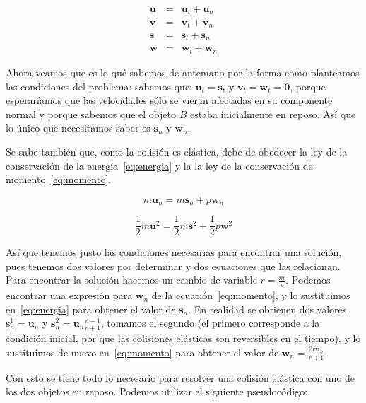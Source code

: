 \begin{eqnarray}
 \textbf{u} & = & \textbf{u}_t + \textbf{u}_n \nonumber \\
 \textbf{v} & = & \textbf{v}_t + \textbf{v}_n \nonumber \\
 \textbf{s} & = & \textbf{s}_t + \textbf{s}_n \nonumber \\
 \textbf{w} & = & \textbf{w}_t + \textbf{w}_n \nonumber
\end{eqnarray}

Ahora veamos que es lo qué sabemos de antemano por la forma como planteamos las condiciones del problema: sabemos que: $\textbf{u}_t = \textbf{s}_t$ y $\textbf{v}_t = \textbf{w}_t = \textbf{0}$, porque esperaríamos que las velocidades sólo se vieran afectadas en su componente normal y porque sabemos que el objeto $B$ estaba inicialmente en reposo.
Así que lo único que necesitamos saber es $\textbf{s}_n$ y $\textbf{w}_n$.

Se sabe también que, como la colisión es elástica, debe de obedecer la ley de la conservación de la energía~\eqref{eq:energia} y la la ley de la conservación de momento~\eqref{eq:momento}.

\begin{equation}
m \textbf{u}_n = m \textbf{s}_n + p \textbf{w}_n
\label{eq:momento}
\end{equation}

\begin{equation}
\frac{1}{2} m \textbf{u}^2 = \frac{1}{2} m \textbf{s}^2 + \frac{1}{2} p \textbf{w}^2
\label{eq:energia}
\end{equation}

Así que tenemos justo las condiciones necesarias para encontrar una solución, pues tenemos dos valores por determinar y dos ecuaciones que las relacionan.
Para encontrar la solución hacemos un cambio de variable $r = \frac{m}{p}$.
Podemos encontrar una expresión para $\textbf{w}_n$ de la ecuación~\eqref{eq:momento}, y lo sustituimos en~\eqref{eq:energia} para obtener el valor de $\textbf{s}_n$. En realidad se obtienen dos valores $\textbf{s}_{n}^{1} = \textbf{u}_n$ y $\textbf{s}_{n}^{2} = \textbf{u}_n \frac{r-1}{r+1}$, tomamos el segundo (el primero corresponde a la condición inicial, por que las colisiones elásticas son reversibles en el tiempo), y lo sustituimos de nuevo en~\eqref{eq:momento} para obtener el valor de $\textbf{w}_n = \frac{2 r \textbf{u}_n}{r + 1}$.

Con esto se tiene todo lo necesario  para resolver una colisión elástica con uno de los dos objetos en reposo. Podemos utilizar el siguiente pseudocódigo:


